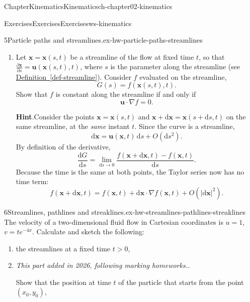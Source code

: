 \documentclass[oneside,10pt,]{book}
\newcommand{\blocktitlefont}{\relax}
\newcommand{\xreffont}{\relax}
\newcommand{\ptxlititle}[1]{{\slshape#1}}
\numberwithin{equation}{section}
\newcommand{\de}{\mathrm{d}}
\newcommand{\dd}[2]{\frac{\de#1}{\de#2}}
\newcommand{\pd}[2]{\frac{\partial#1}{\partial#2}}
\newcommand{\bx}{\boldsymbol{x}}
\newcommand{\bu}{\boldsymbol{u}}
\begin{document}
\begin{chapterptx}{Chapter}{Kinematics}{}{Kinematics}{}{}{ch-chapter02-kinematics}
\begin{exercises-section}{Exercises}{Exercises}{}{Exercises}{}{}{ws-kinematics}
\begin{divisionexercise}{5}{Particle paths and streamlines.}{}{ex-hw-particle-paths-streamlines}
\begin{enumerate}[font=\bfseries,label=(\alph*),ref=\alph*]
\pd{f}{y} + \de z \, \pd{f}{z}\). Substitute for \(\de\bx\) and let \(\de t \to
0\).%
\item{}Let \(\bx = \bx(s, t)\) be a streamline of the flow at fixed time \(t\), so that \(\pd{\bx}{s} = \bu(\bx(s, t), t)\), where \(s\) is the parameter along the streamline (see \hyperref[def-streamline]{Definition~{\xreffont\ref{def-streamline}}}). Consider \(f\) evaluated on the streamline,%
\begin{equation*}
G(s) = f(\bx(s, t), t).
\end{equation*}
Show that \(f\) is constant along the streamline if and only if%
\begin{equation*}
\bu \cdot \nabla f = 0.
\end{equation*}
%
\par\smallskip%
\noindent\textbf{\blocktitlefont Hint}.\hypertarget{ex-hw-particle-paths-streamlines-5-2}{}\quad{}Consider the points \(\bx = \bx(s, t)\) and \(\bx + \de\bx = \bx(s + \de s, t)\) on the same streamline, at the \emph{same} instant \(t\). Since the curve is a streamline,%
\begin{equation*}
\de\bx = \bu(\bx, t) \, \de s + O(\de s^2).
\end{equation*}
By definition of the derivative,%
\begin{equation*}
\dd{G}{s} = \lim_{\de s \to 0} \frac{f(\bx + \de\bx, t) - f(\bx, t)}{\de s}.
\end{equation*}
Because the time is the same at both points, the Taylor series now has no time term:%
\begin{equation*}
f(\bx + \de\bx, t) = f(\bx, t) + \de\bx \cdot \nabla f(\bx, t) + O(|\de\bx|^2).
\end{equation*}
%
\end{enumerate}%
\end{divisionexercise}%
\begin{divisionexercise}{6}{Streamlines, pathlines and streaklines.}{}{ex-hw-streamlines-pathlines-streaklines}%
The velocity of a two-dimensional fluid flow in Cartesian coordinates is \(u = 1\), \(v
= t e^{-4x}\). Calculate and sketch the following:%
\begin{enumerate}[font=\bfseries,label=(\alph*),ref=\alph*]%
\item{}the streamlines at a fixed time \(t > 0\),%
\item{}\ptxlititle{This part added in 2026, following marking homeworks..}\par%
Show that the position at time \(t\) of the particle that starts from the point \((x_0,y_0)\),%

\end{enumerate}
\end{divisionexercise}
\end{exercises-section}
\end{chapterptx}
\end{document}
